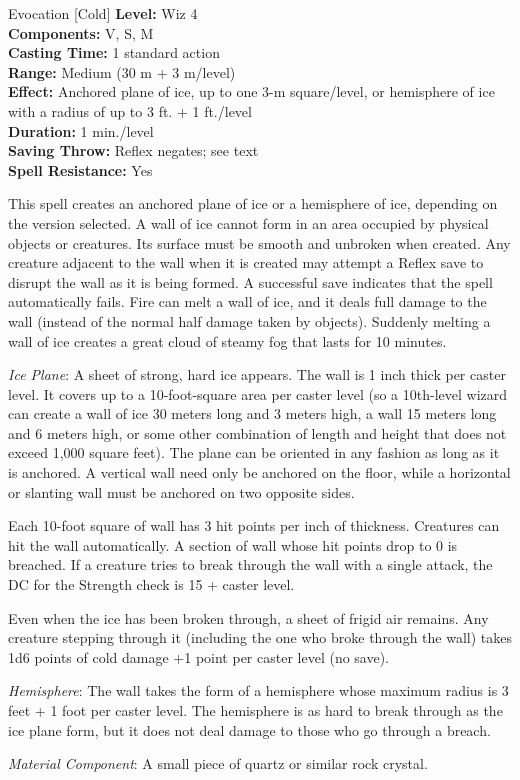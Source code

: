 {Evocation [Cold]}
{
	\textbf{Level:}
	Wiz 4\\
	\textbf{Components:}
	V, S, M\\
	\textbf{Casting Time:}
	1 standard action\\
	\textbf{Range:}
	Medium (30 m + 3 m/level)\\
	\textbf{Effect:}
	Anchored plane of ice, up to one 3-m square/level, or hemisphere of ice with a radius of up to 3 ft. + 1 ft./level\\
	\textbf{Duration:}
	1 min./level\\
	\textbf{Saving Throw:}
	Reflex negates; see text\\
	\textbf{Spell Resistance:}
	Yes\\
}
{
	This spell creates an anchored plane of ice or a hemisphere of ice, depending on the version selected. A wall of ice cannot form in an area occupied by physical objects or creatures. Its surface must be smooth and unbroken when created. Any creature adjacent to the wall when it is created may attempt a Reflex save to disrupt the wall as it is being formed. A successful save indicates that the spell automatically fails. Fire can melt a wall of ice, and it deals full damage to the wall (instead of the normal half damage taken by objects). Suddenly melting a wall of ice creates a great cloud of steamy fog that lasts for 10 minutes.

	\textit{Ice Plane}:
	A sheet of strong, hard ice appears. The wall is 1 inch thick per caster level. It covers up to a 10-foot-square area per caster level (so a 10th-level wizard can create a wall of ice 30 meters long and 3 meters high, a wall 15 meters long and 6 meters high, or some other combination of length and height that does not exceed 1,000 square feet). The plane can be oriented in any fashion as long as it is anchored. A vertical wall need only be anchored on the floor, while a horizontal or slanting wall must be anchored on two opposite sides.

	Each 10-foot square of wall has 3 hit points per inch of thickness. Creatures can hit the wall automatically. A section of wall whose hit points drop to 0 is breached. If a creature tries to break through the wall with a single attack, the DC for the Strength check is 15 + caster level.

	Even when the ice has been broken through, a sheet of frigid air remains. Any creature stepping through it (including the one who broke through the wall) takes 1d6 points of cold damage +1 point per caster level (no save).

	\textit{Hemisphere}:
	The wall takes the form of a hemisphere whose maximum radius is 3 feet + 1 foot per caster level. The hemisphere is as hard to break through as the ice plane form, but it does not deal damage to those who go through a breach.

	\textit{Material Component}:
	A small piece of quartz or similar rock crystal.

}
